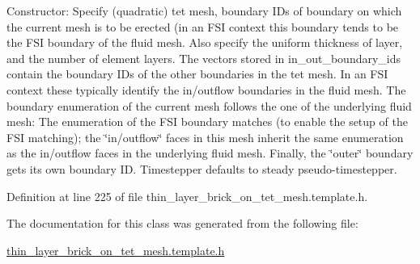 Constructor\+: Specify (quadratic) tet mesh, boundary I\+Ds of boundary on which the current mesh is to be erected (in an F\+SI context this boundary tends to be the F\+SI boundary of the fluid mesh. Also specify the uniform thickness of layer, and the number of element layers. The vectors stored in in\+\_\+out\+\_\+boundary\+\_\+ids contain the boundary I\+Ds of the other boundaries in the tet mesh. In an F\+SI context these typically identify the in/outflow boundaries in the fluid mesh. The boundary enumeration of the current mesh follows the one of the underlying fluid mesh\+: The enumeration of the F\+SI boundary matches (to enable the setup of the F\+SI matching); the \char`\"{}in/outflow\char`\"{} faces in this mesh inherit the same enumeration as the in/outflow faces in the underlying fluid mesh. Finally, the \char`\"{}outer\char`\"{} boundary gets its own boundary ID. Timestepper defaults to steady pseudo-\/timestepper. 



Definition at line 225 of file thin\+\_\+layer\+\_\+brick\+\_\+on\+\_\+tet\+\_\+mesh.\+template.\+h.



The documentation for this class was generated from the following file\+:\begin{DoxyCompactItemize}
\item 
\hyperlink{thin__layer__brick__on__tet__mesh_8template_8h}{thin\+\_\+layer\+\_\+brick\+\_\+on\+\_\+tet\+\_\+mesh.\+template.\+h}\end{DoxyCompactItemize}
